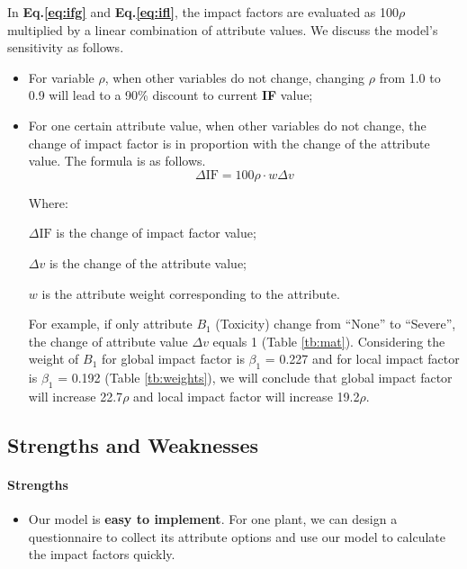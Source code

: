 \documentclass[12pt]{article}
\begin{document}
		In \textbf{Eq.\ref{eq:ifg}} and \textbf{Eq.\ref{eq:ifl}}, the impact factors are evaluated as 100$\rho$ multiplied by a linear combination of attribute values.  We discuss the model's sensitivity as follows.
		\vspace{-0.2cm}
		\begin{itemize}
			\item For variable $\rho$, when other variables do not change, changing $\rho$ from 1.0 to 0.9 will lead to a 90\% discount to current \textbf{IF} value;
			\vspace{-0.2cm}
			\item For one certain attribute value, when other variables do not change, the change of impact factor is in proportion with the change of the attribute value.  The formula is as follows.
			\[
				\Delta\mathrm{IF} = 100\rho\cdot w\Delta v
			\]
			
			Where:
			
			{
			\setlength{\parindent}{2em}
			$\Delta\mathrm{IF}$ is the change of impact factor value;
			
			\vspace{-0.15cm}
			$\Delta v$ is the change of the attribute value;
			
			\vspace{-0.15cm}
			$w$ is the attribute weight corresponding to the attribute.
			}
			
			\vspace{0.15cm}
			For example, if only attribute $B_1$ (Toxicity) change from ``None'' to ``Severe'', the change of attribute value $\Delta v$ equals 1 (Table \ref{tb:mat}).  Considering the weight of $B_1$ for global impact factor is $\beta_1$ = 0.227 and for local impact factor is $\beta_1$ = 0.192 (Table \ref{tb:weights}), we will conclude that global impact factor will increase 22.7$\rho$ and local impact factor will increase 19.2$\rho$.
			
		\end{itemize} 
		
		
	\subsection{Strengths and Weaknesses}

		\paragraph{Strengths}
		\vspace{-0.1cm}
		\begin{itemize}
			\vspace{-0.3cm}
			\item Our model is \textbf{easy to implement}.  For one plant, we can design a questionnaire to collect its attribute options and use our model to calculate the impact factors quickly.
		\end{itemize}
		
\end{document}
